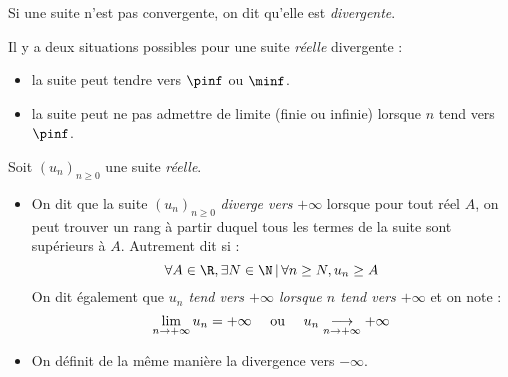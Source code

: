 \documentclass[a4paper,10pt]{report}
\begin{document}
\begin{preuve}

\vspace{11cm}
%
%
%

\end{preuve}

\begin{defin} Si une suite n'est pas convergente, on dit qu'elle est \textit{divergente}.
\end{defin}

\noindent Il y a deux situations possibles pour une suite \textit{réelle} divergente :
\begin{itemize}
 \item la suite peut tendre vers $\pinf$ ou $\minf$.
 \item la suite peut ne pas admettre de limite (finie ou infinie) lorsque $n$ tend vers $\pinf$.
\end{itemize}


\begin{defin}
Soit $(u_n)_{n \geq 0}$ une suite \textit{réelle}.
\begin{itemize}
\item On dit que la suite $(u_n)_{n \geq 0}$ \textit{diverge vers} $+\infty$ lorsque pour tout réel $A$, on peut trouver un rang à partir duquel tous les termes de la suite sont supérieurs à $A$. Autrement dit si :
$$\forall A \in \R, \exists N \in \N \, \vert \, \forall n \ge N, u_n \geq A $$
On dit également que \textit{$u_n$ tend vers $+\infty$ lorsque $n$ tend vers $+\infty$} et on note :
$$\displaystyle{\lim_{n \rightarrow +\infty}u_n=+\infty} \quad \hbox{ ou } \quad u_n \underset{n \rightarrow + \infty}{\longrightarrow} + \infty $$
\item On définit de la même manière la divergence vers $- \infty$.
\end{itemize}
\end{defin}
\end{document}

